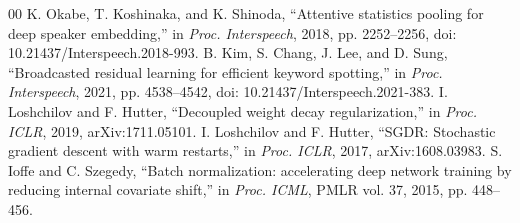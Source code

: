 \documentclass[conference]{IEEEtran}
\begin{document}
\begin{thebibliography}{00}
 K. Okabe, T. Koshinaka, and K. Shinoda, ``Attentive statistics pooling for deep speaker embedding,'' in \textit{Proc. Interspeech}, 2018, pp. 2252--2256, doi: 10.21437/Interspeech.2018-993.
 B. Kim, S. Chang, J. Lee, and D. Sung, ``Broadcasted residual learning for efficient keyword spotting,'' in \textit{Proc. Interspeech}, 2021, pp. 4538--4542, doi: 10.21437/Interspeech.2021-383.
 I. Loshchilov and F. Hutter, ``Decoupled weight decay regularization,'' in \textit{Proc. ICLR}, 2019, arXiv:1711.05101.
 I. Loshchilov and F. Hutter, ``SGDR: Stochastic gradient descent with warm restarts,'' in \textit{Proc. ICLR}, 2017, arXiv:1608.03983.
 S. Ioffe and C. Szegedy, ``Batch normalization: accelerating deep network training by reducing internal covariate shift,'' in \textit{Proc. ICML}, PMLR vol. 37, 2015, pp. 448--456.
\end{thebibliography}
\end{document}
